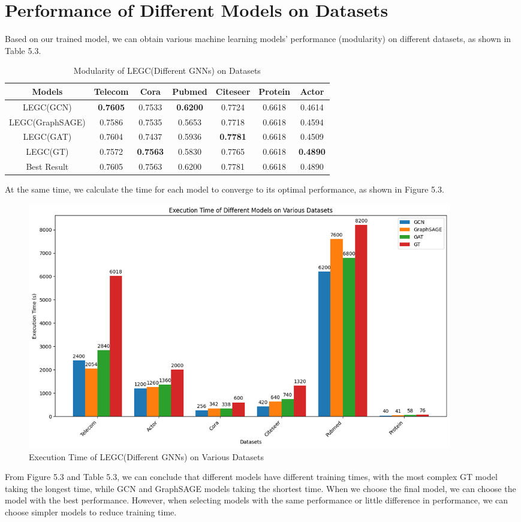 \documentclass[ %
                    author={Tengyao Tu},
                supervisor={Dr. James Pope},
                    degree={MSc},
                     title={A New Perspective on Graph Community Detection: Combining Traditional Methods with Deep Learning Approaches},
                  subtitle={Applying to Telecom Networks and Diverse Datasets},
                      type={},
                      year={2024}]{dissertation}
\begin{document}
\section{Performance of Different Models on Datasets}
Based on our trained model, we can obtain various machine learning models' performance (modularity) on different datasets, as shown in Table 5.3.
\begin{table}[!htbp] 
\centering 
\label{Basic Infomation} 
\caption{Modularity of LEGC(Different GNNs) on Datasets} 
\vspace{5pt} 
\begin{tabular}{ccccccc} 
\hline 
Models &Telecom&Cora&Pubmed&Citeseer&Protein&Actor \\ 
\hline
LEGC(GCN)&\textbf{0.7605}&0.7533&\textbf{0.6200}&0.7724&0.6618&0.4614\\
LEGC(GraphSAGE)&0.7586&0.7535& 0.5653&0.7718&0.6618&0.4594\\
LEGC(GAT)&0.7604&0.7437&0.5936&\textbf{0.7781}&0.6618&0.4509\\
LEGC(GT)&0.7572&\textbf{0.7563}&0.5830&0.7765&0.6618&\textbf{0.4890}\\
\hline
Best Result&0.7605&0.7563&0.6200&0.7781&0.6618&0.4890\\
\hline
\end{tabular}
\end{table}
At the same time, we calculate the time for each model to converge to its optimal performance, as shown in Figure 5.3.
\begin{figure}[h!] %
    \centering
    \includegraphics[width=0.9\textwidth]{Figure_11.png} %
    \caption{Execution Time of LEGC(Different GNNs) on Various Datasets}
    \label{virtual Graph Data Map}
\end{figure}
From Figure 5.3 and Table 5.3, we can conclude that different models have different training times, with the most complex GT model taking the longest time, while GCN and GraphSAGE models taking the shortest time. When we choose the final model, we can choose the model with the best performance. However, when selecting models with the same performance or little difference in performance, we can choose simpler models to reduce training time. 
\end{document}
